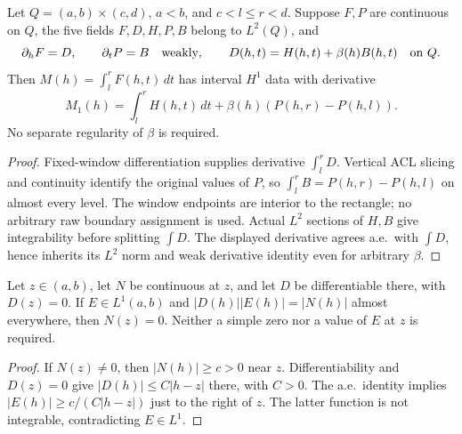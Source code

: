 \begin{lemma}
\label{lem:fixed-window-flux}
\leanok
Let $Q=(a,b)\times(c,d)$, $a<b$, and $c<l\le r<d$.
Suppose $F,P$ are continuous on $Q$, the five fields
$F,D,H,P,B$ belong to $L^2(Q)$, and
\[
 \partial_hF=D,\qquad \partial_tP=B
 \quad\hbox{weakly},\qquad D(h,t)=H(h,t)+\beta(h)B(h,t)
 \quad\hbox{on }Q.
\]
Then $M(h)=\int_l^rF(h,t)\,dt$ has interval $H^1$ data with derivative
\[
 M_1(h)=\int_l^rH(h,t)\,dt+\beta(h)(P(h,r)-P(h,l)).
\]
No separate regularity of $\beta$ is required.
\end{lemma}

\begin{proof}
\leanok
Fixed-window differentiation supplies derivative $\int_l^rD$.
Vertical ACL slicing and continuity identify the original values of $P$,
so $\int_l^rB=P(h,r)-P(h,l)$ on almost every level.
The window endpoints are interior to the rectangle; no arbitrary raw
boundary assignment is used. Actual $L^2$ sections of $H,B$ give
integrability before splitting $\int D$.
The displayed derivative agrees a.e.\ with $\int D$, hence inherits
its $L^2$ norm and weak derivative identity even for arbitrary $\beta$.
\end{proof}

\begin{lemma}
\label{lem:integrable-divisor-cancellation}
\leanok
Let $z\in(a,b)$, let $N$ be continuous at $z$, and let $D$ be
differentiable there, with $D(z)=0$. If $E\in L^1(a,b)$ and
$|D(h)||E(h)|=|N(h)|$ almost everywhere, then $N(z)=0$.
Neither a simple zero nor a value of $E$ at $z$ is required.
\end{lemma}

\begin{proof}
\leanok
If $N(z)\ne0$, then $|N(h)|\ge c>0$ near $z$.
Differentiability and $D(z)=0$ give $|D(h)|\le C|h-z|$
there, with $C>0$. The a.e.\ identity implies
$|E(h)|\ge c/(C|h-z|)$ just to the right of $z$.
The latter function is not integrable, contradicting $E\in L^1$.
\end{proof}


